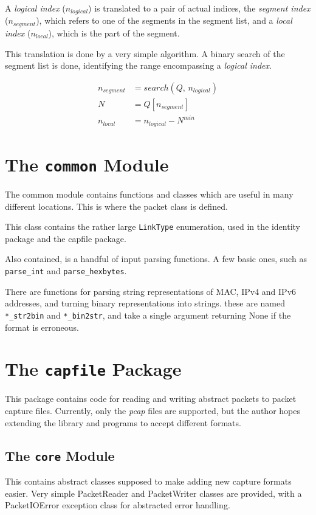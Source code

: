 \documentclass[10pt,a4paper,notitlepage,twoside]{report}
\begin{document}
A \emph{logical index} ($n_{logical}$) is translated to a pair of actual indices, the \emph{segment index} ($n_{segment}$), which refers to one of the segments in the segment list, and a \emph{local index} ($n_{local}$), which is the part of the segment.

This translation is done by a very simple algorithm. A binary search of the segment list is done, identifying the range encompassing a \emph{logical index}.

\begin{align*}
n_{segment} &= search(Q,\,n_{logical})\\
N &= Q[n_{segment}]\\
n_{local} &= n_{logical} - N^{min}
\end{align*}

\section{The \texttt{common} Module}
The common module contains functions and classes which are useful in many different locations.
This is where the packet class is defined.

This class contains the rather large \texttt{LinkType} enumeration, used in the identity package and the capfile package.

Also contained, is a handful of input parsing functions. A few basic ones, such as \texttt{parse_int} and \texttt{parse_hexbytes}.

There are functions for parsing string representations of MAC, IPv4 and IPv6 addresses, and turning binary representations into strings. these are named \texttt{*_str2bin} and \texttt{*_bin2str}, and take a single argument returning None if the format is erroneous.

\section{The \texttt{capfile} Package}
This package contains code for reading and writing abstract packets to packet capture files. Currently, only the \emph{pcap} files are supported, but the author hopes extending the library and programs to accept different formats.
 
\subsection{The \texttt{core} Module}
This contains abstract classes supposed to make adding new capture formats easier. Very simple PacketReader and PacketWriter classes are provided, with a PacketIOError exception class for abstracted error handling.
\end{document}
